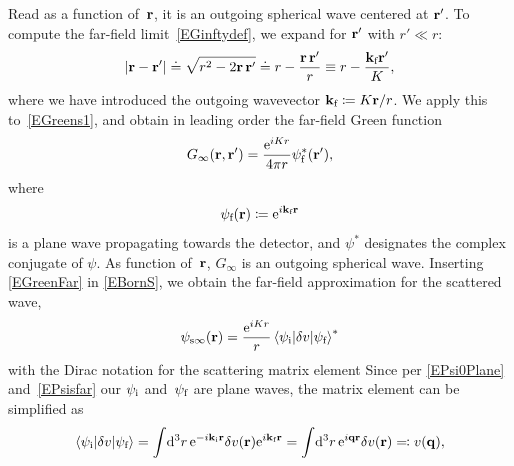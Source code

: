 Read as a function of~$\r$, it is an outgoing spherical wave centered at $\r'$.
To compute the far-field limit~\cref{EGinftydef},
we expand for $\r'$ with $r'\ll r$:
\begin{equation}
  \left|\r-\r'\right|
  \doteq \sqrt{r^2-2\r\,\r'}
  \doteq r - \frac{\r\,\r'}{r}
  \equiv r - \frac{\k_\sf \r'}{K},
\end{equation}
%
where we have introduced the outgoing wavevector
$  \k_\sf\coloneqq K \r / r$.
We apply this to~\cref{EGreens1},
%
and obtain in leading order the far-field Green function
\begin{equation}%
  G_\infty(\r,\r')
  = \frac{\e^{iKr}}{4\pi r}\psi^*_\sf(\r'),
\end{equation}
where
\begin{equation}%
  \psi_\sf(\r) \coloneqq  \e^{i\k_\sf \r}
\end{equation}
%
is a plane wave propagating towards the detector,
and $\psi^*$ designates the complex conjugate of $\psi$.
As function of~$\r$, $G_\infty$ is an outgoing spherical wave.
Inserting \cref{EGreenFar} in \cref{EBornS},
we obtain the far-field approximation for the scattered wave,
%
\begin{equation}%
  \psi_{\text{s}\infty}(\r)
  = \frac{\e^{iKr}}{r}
    \braket{\psi_\si|\delta v|\psi_\sf}^*
\end{equation}
%
with the Dirac notation for the scattering matrix element
%
%
%
Since per \cref{EPsi0Plane} and~\cref{EPsisfar} our $\psi_\si$ and~$\psi_\sf$ are plane waves,
the matrix element can be simplified as
\begin{equation}%
  \braket{\psi_\si|\delta v|\psi_\sf}
  = \int\!\d^3r\, {\rm e}^{-i\k_\si\r}\delta v(\r){\rm e}^{i\k_\sf\r}
  = \int\!\d^3r\, {\rm e}^{i\q\r}\delta v(\r)
  \eqqcolon v(\q),
\end{equation}
